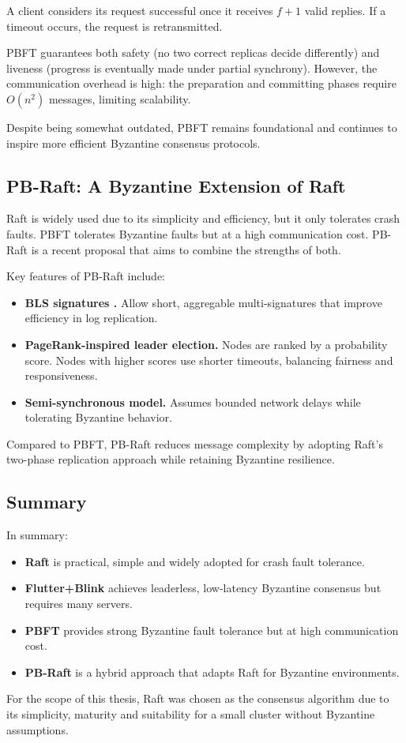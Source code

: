 A client considers its request successful once it receives $f+1$ valid replies. If a timeout occurs, the request is retransmitted.  

PBFT guarantees both safety (no two correct replicas decide differently) and liveness (progress is eventually made under partial synchrony). However, the communication overhead is high: the preparation and committing phases require $O(n^2)$ messages, limiting scalability.  

Despite being somewhat outdated, PBFT remains foundational and continues to inspire more efficient Byzantine consensus protocols.

\subsection{PB-Raft: A Byzantine Extension of Raft}

Raft is widely used due to its simplicity and efficiency, but it only tolerates crash faults. PBFT tolerates Byzantine faults but at a high communication cost.  
PB-Raft \cite{shi2025pb} is a recent proposal that aims to combine the strengths of both.

Key features of PB-Raft include:
\begin{itemize}
    \item \textbf{BLS signatures \cite{boneh2001short}.} Allow short, aggregable multi-signatures that improve efficiency in log replication.
    \item \textbf{PageRank-inspired leader election.} Nodes are ranked by a probability score. Nodes with higher scores use shorter timeouts, balancing fairness and responsiveness.
    \item \textbf{Semi-synchronous model.} Assumes bounded network delays while tolerating Byzantine behavior.
\end{itemize}

Compared to PBFT, PB-Raft reduces message complexity by adopting Raft's two-phase replication approach while retaining Byzantine resilience.  

\subsection{Summary}

In summary:
\begin{itemize}
    \item \textbf{Raft} is practical, simple and widely adopted for crash fault tolerance.
    \item \textbf{Flutter+Blink} achieves leaderless, low-latency Byzantine consensus but requires many servers.
    \item \textbf{PBFT} provides strong Byzantine fault tolerance but at high communication cost.
    \item \textbf{PB-Raft} is a hybrid approach that adapts Raft for Byzantine environments.
\end{itemize}

For the scope of this thesis, Raft was chosen as the consensus algorithm due to its simplicity, maturity and suitability for a small cluster without Byzantine assumptions.

